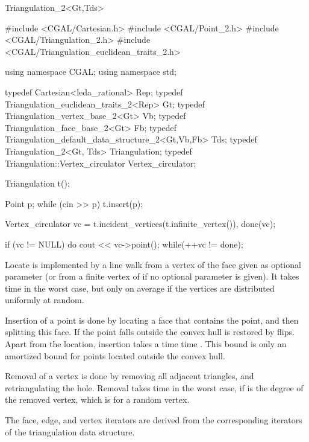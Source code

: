 \begin{ccClassTemplate}{Triangulation_2<Gt,Tds>}
\begin{cprog}
#include <CGAL/Cartesian.h>
#include <CGAL/Point_2.h>
#include <CGAL/Triangulation_2.h>
#include <CGAL/Triangulation_euclidean_traits_2.h>

using namespace CGAL;
using namespace std;

typedef Cartesian<leda_rational> Rep;
typedef Triangulation_euclidean_traits_2<Rep> Gt;
typedef Triangulation_vertex_base_2<Gt> Vb;
typedef Triangulation_face_base_2<Gt>  Fb;
typedef Triangulation_default_data_structure_2<Gt,Vb,Fb> Tds;
typedef Triangulation_2<Gt, Tds> Triangulation;
typedef Triangulation::Vertex_circulator Vertex_circulator;

{
    Triangulation t();

    Point p;
    while (cin >> p){
        t.insert(p);
    }

    Vertex_circulator vc = t.incident_vertices(t.infinite_vertex()),
                      done(vc);

    if (vc != NULL) {
        do{
            cout << vc->point();
        }while(++vc != done);
    }
}
\end{cprog} 


Locate is implemented by a line walk from a vertex of the face given
as optional parameter (or from a finite vertex of
 if no optional parameter is given). It takes
time  in the worst case, but only 
on average if the vertices are distributed uniformly at random.

Insertion of a point is done by locating a face that contains the
point, and then splitting this face.
If the point falls outside the convex hull is restored 
by flips.  Apart from the location, insertion takes a time 
time . This bound is only an amortized bound
for points located outside the convex hull.

Removal of a vertex is done by removing all adjacent triangles, and
retriangulating the hole. Removal takes time  in the worst
case, if  is the degree of the removed vertex,
which is  for a random vertex.

The face, edge, and vertex iterators are 
derived from the corresponding iterators
of the triangulation data structure.

\end{ccClassTemplate}


